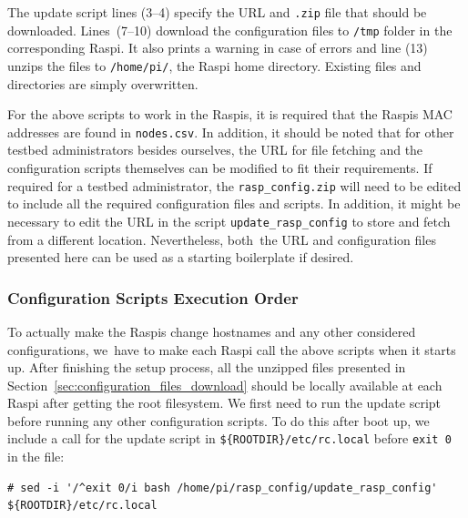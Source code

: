 \documentclass[electronics,article,accept,moreauthors,pdftex,10pt,a4paper]{mdpi}
\theoremstyle{mdpi}
\newcounter{ex}
\newcounter{re}
\theoremstyle{mdpidefinition}
\begin{document}
The update script lines (3--4) specify the URL and \texttt{.zip} file that
should be downloaded. Lines~(7--10) download the configuration files to \texttt{/tmp}
folder in the corresponding Raspi. It also prints a warning in case of
errors and line (13) unzips the files to \texttt{/home/pi/}, the Raspi home
directory. Existing files and directories are simply overwritten.

For the above scripts to work in the Raspis, it is required that the
Raspis MAC addresses are found in \texttt{nodes.csv}. In addition, it
should be noted that for other testbed administrators besides ourselves,
the URL for file fetching and the configuration
scripts themselves can be modified to fit their requirements. If
required for a testbed administrator, the \texttt{rasp\_config.zip}
will need to be edited to include all the required configuration files
and scripts. In addition, it might be necessary to edit the URL in the script
\texttt{update\_rasp\_config} to store and fetch from a different location.
Nevertheless, both~the URL and configuration files presented here can be
used as a starting boilerplate if desired.

\subsubsection{Configuration Scripts Execution Order}
To actually make the Raspis change hostnames and any other considered
configurations, we~have to make each Raspi call the above scripts when
it starts up. After finishing the setup process, all the unzipped files
presented in Section~\ref{sec:configuration_files_download} should be
locally available at each Raspi after getting the root filesystem.
We first need to run the update script before running
any other configuration scripts. To do this after boot up, we include
a call for the update script in \texttt{\$\{ROOTDIR\}/etc/rc.local} before
\texttt{exit 0} in the file:
\newpage

\Suppressnumber\begin{lstlisting}[]
# sed -i '/^exit 0/i bash /home/pi/rasp_config/update_rasp_config' ${ROOTDIR}/etc/rc.local
\end{lstlisting}
\FloatBarrier
\vspace{-5mm}

\end{document}
